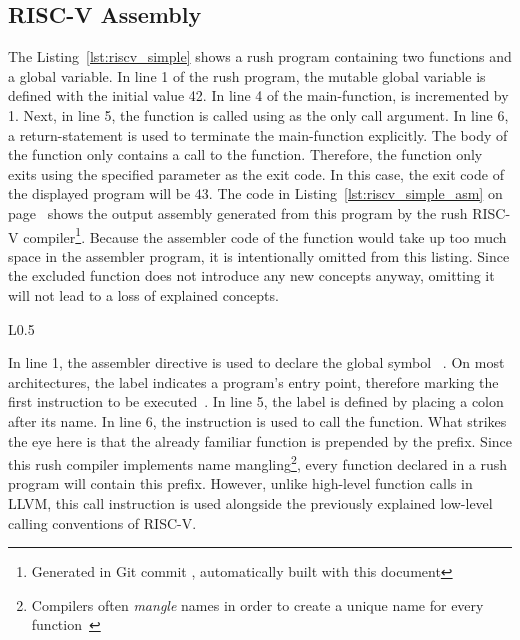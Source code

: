 \subsection{RISC-V Assembly}

The Listing~\ref{lst:riscv_simple} shows a rush program containing two functions and a global variable.
In line 1 of the rush program, the mutable global variable  is defined with the initial value 42.
In line 4 of the main-function,  is incremented by 1.
Next, in line 5, the  function is called using  as the only call argument.
In line 6, a return-statement is used to terminate the main-function explicitly.
The body of the  function only contains a call to the  function.
Therefore, the  function only exits using the specified parameter  as the exit code.
In this case, the exit code of the displayed program will be 43.
The code in Listing~\ref{lst:riscv_simple_asm} on page~\pageref{lst:riscv_simple_asm} shows the output assembly generated from this program by the rush RISC-V compiler\footnote{Generated in Git commit \rushCommit, automatically built with this document}.
Because the assembler code of the  function would take up too much space in the assembler program, it is intentionally omitted from this listing.
Since the excluded function does not introduce any new concepts anyway, omitting it will not lead to a loss of explained concepts.


\begin{wrapfigure}{L}{0.5\textwidth}
	\centering
	\caption{Compiler Output from the Rush Program in Listing~\ref{lst:riscv_simple}}\label{lst:riscv_simple_asm}
\end{wrapfigure}

In line 1, the  assembler directive is used to declare the global symbol ~\cite[p~.36]{Patterson2017}.
On most architectures, the  label indicates a program's entry point, therefore marking the first instruction to be executed~\cite[p.~19]{Zhirkov2017-wk}.
In line 5, the  label is defined by placing a colon after its name.
In line 6, the  instruction is used to call the  function.
What strikes the eye here is that the already familiar  function is prepended by the  prefix.
Since this rush compiler implements name mangling\footnote{Compilers often \emph{mangle} names in order to create a unique name for every function~\cite[pp.~119-120]{Levine2000}},
every function declared in a rush program will contain this prefix.
However, unlike high-level function calls in LLVM, this call instruction is used alongside the previously explained low-level calling conventions of RISC-V.

